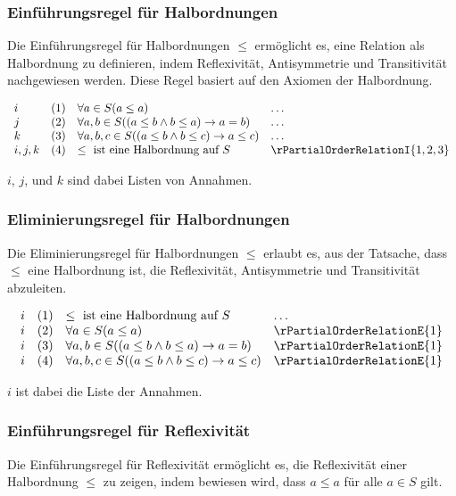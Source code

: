 \documentclass{book}
\theoremstyle{plain}
\theoremstyle{remark}
\theoremstyle{definition}
\begin{document}
\subsubsection*{Einführungsregel für Halbordnungen}
\label{rule:rPartialOrderRelationI}
Die Einführungsregel für Halbordnungen \(\leq\) ermöglicht es, eine Relation als Halbordnung zu definieren, indem Reflexivität, Antisymmetrie und Transitivität nachgewiesen werden. Diese Regel basiert auf den Axiomen der Halbordnung.

\[
\begin{array}{llll}
    i       & (1) & \forall a \in S (a \leq a) & \dots \\
    j       & (2) & \forall a, b \in S ((a \leq b \land b \leq a) \rightarrow a = b) & \dots \\
    k       & (3) & \forall a, b, c \in S ((a \leq b \land b \leq c) \rightarrow a \leq c) & \dots \\
    i,j,k   & (4) & \leq \text{ ist eine Halbordnung auf } S & \rPartialOrderRelationI{1,2,3}
\end{array}
\]

\(i\), \(j\), und \(k\) sind dabei Listen von Annahmen.

\subsubsection*{Eliminierungsregel für Halbordnungen}
\label{rule:rPartialOrderRelationE}
Die Eliminierungsregel für Halbordnungen \(\leq\) erlaubt es, aus der Tatsache, dass \(\leq\) eine Halbordnung ist, die Reflexivität, Antisymmetrie und Transitivität abzuleiten.

\[
\begin{array}{llll}
    i       & (1) & \leq \text{ ist eine Halbordnung auf } S & \dots \\
    i       & (2) & \forall a \in S (a \leq a) & \rPartialOrderRelationE{1} \\
    i       & (3) & \forall a, b \in S ((a \leq b \land b \leq a) \rightarrow a = b) & \rPartialOrderRelationE{1} \\
    i       & (4) & \forall a, b, c \in S ((a \leq b \land b \leq c) \rightarrow a \leq c) & \rPartialOrderRelationE{1}
\end{array}
\]

\(i\) ist dabei die Liste der Annahmen.

\subsubsection*{Einführungsregel für Reflexivität}
\label{rule:rReflexivityOrdRI}
Die Einführungsregel für Reflexivität ermöglicht es, die Reflexivität einer Halbordnung \(\leq\) zu zeigen, indem bewiesen wird, dass \(a \leq a\) für alle \(a \in S\) gilt.
\end{document}
